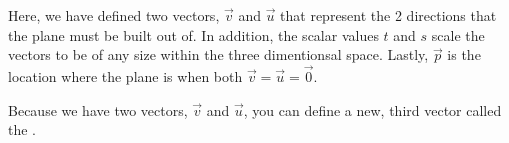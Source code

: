 Here, we have defined two vectors, $\vec{v}$ and $\vec{u}$ that represent the 2 directions that the plane must be built out of.
In addition, the scalar values $t$ and $s$ scale the vectors to be of any size within the three dimentionsal space.
Lastly, $\vec{p}$ is the location where the plane is when both $\vec{v} = \vec{u} = \vec{0}$.

Because we have two vectors, $\vec{v}$ and $\vec{u}$, you can define a new, third vector called the .


